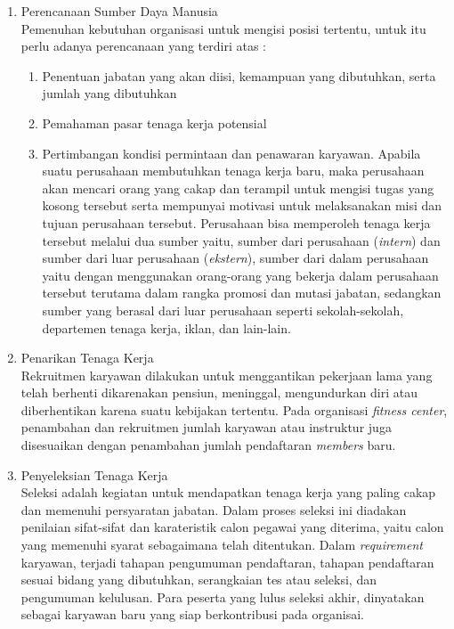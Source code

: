 \begin{enumerate}

\item Perencanaan Sumber Daya Manusia \\
Pemenuhan kebutuhan organisasi untuk mengisi posisi tertentu, untuk itu perlu adanya perencanaan yang terdiri atas :

\begin{enumerate}

\item Penentuan jabatan yang akan diisi, kemampuan yang dibutuhkan, serta jumlah yang dibutuhkan

\item Pemahaman pasar tenaga kerja potensial

\item Pertimbangan kondisi permintaan dan penawaran karyawan. Apabila suatu perusahaan membutuhkan tenaga kerja baru, maka perusahaan akan mencari orang yang cakap dan terampil untuk mengisi tugas yang kosong tersebut serta mempunyai motivasi untuk melaksanakan misi dan tujuan perusahaan tersebut. Perusahaan bisa memperoleh tenaga kerja tersebut melalui dua sumber yaitu, sumber dari perusahaan (\textit{intern}) dan sumber dari luar perusahaan (\textit{ekstern}), sumber dari dalam perusahaan yaitu dengan menggunakan orang-orang yang bekerja dalam perusahaan tersebut terutama dalam rangka promosi dan mutasi jabatan, sedangkan sumber yang berasal dari luar perusahaan seperti sekolah-sekolah, departemen tenaga kerja, iklan, dan lain-lain.

\end{enumerate}

\item Penarikan Tenaga Kerja \\
Rekruitmen karyawan dilakukan untuk menggantikan pekerjaan lama yang telah berhenti dikarenakan pensiun, meninggal, mengundurkan diri atau diberhentikan karena suatu kebijakan tertentu. Pada organisasi \textit{fitness center}, penambahan dan rekruitmen jumlah karyawan atau instruktur juga disesuaikan dengan penambahan jumlah pendaftaran \textit{members} baru.

\item Penyeleksian Tenaga Kerja \\ 
Seleksi adalah kegiatan untuk mendapatkan tenaga kerja yang paling cakap dan memenuhi persyaratan jabatan. Dalam proses seleksi ini diadakan penilaian sifat-sifat dan karateristik calon pegawai yang diterima, yaitu calon yang memenuhi syarat sebagaimana telah ditentukan. Dalam \textit{requirement} karyawan, terjadi tahapan pengumuman pendaftaran, tahapan pendaftaran sesuai bidang yang dibutuhkan, serangkaian tes atau seleksi, dan pengumuman kelulusan. Para peserta yang lulus seleksi akhir, dinyatakan sebagai karyawan baru yang siap berkontribusi pada organisai. 


\end{enumerate}
